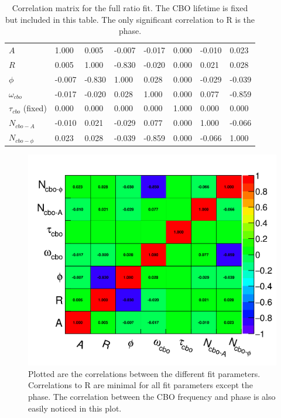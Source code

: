 	\begin{table}[]
	\setlength\tabcolsep{0pt}
	\begin{tabular*}{\linewidth}{@{\extracolsep{\fill}}lLBLLLLL}
	  \toprule
	            &  &  & \thead{$\phi$} &  &  &  &  \\
	  \midrule
		$A$    			 	 &  1.000  &  0.005  & -0.007  & -0.017  &  0.000  & -0.010  &  0.023  \\
		$R$     			 &  0.005  &  1.000  & -0.830  & -0.020  &  0.000  &  0.021  &  0.028  \\
		$\phi$   			 & -0.007  & -0.830  &  1.000  &  0.028  &  0.000  & -0.029  & -0.039  \\
		$\omega_{cbo}$   	 & -0.017  & -0.020  &  0.028  &  1.000  &  0.000  &  0.077  & -0.859  \\
		$\tau_{cbo}$ (fixed) &  0.000  &  0.000  &  0.000  &  0.000  &  1.000  &  0.000  &  0.000  \\
		$N_{cbo-A}$   	 	 & -0.010  &  0.021  & -0.029  &  0.077  &  0.000  &  1.000  & -0.066  \\
		$N_{cbo-\phi}$   	 &  0.023  &  0.028  & -0.039  & -0.859  &  0.000  & -0.066  &  1.000  \\
	  \bottomrule
	\end{tabular*}
	\caption{Correlation matrix for the full ratio fit. The CBO lifetime is fixed but included in this table. The only significant correlation to R is the \gmtwo phase.}
	\label{Tab:CorrMat}
	\end{table}

	\begin{figure}[]
		\centering
		\includegraphics[width=\textwidth]{CorrelationMatrix}
	    \caption[CorrelationMatrix]{Plotted are the correlations between the different fit parameters. Correlations to R are minimal for all fit parameters except the \gmtwo phase. The correlation between the CBO frequency and phase is also easily noticed in this plot.}
	    \label{fig:CorrelationMatrix}
	\end{figure}

